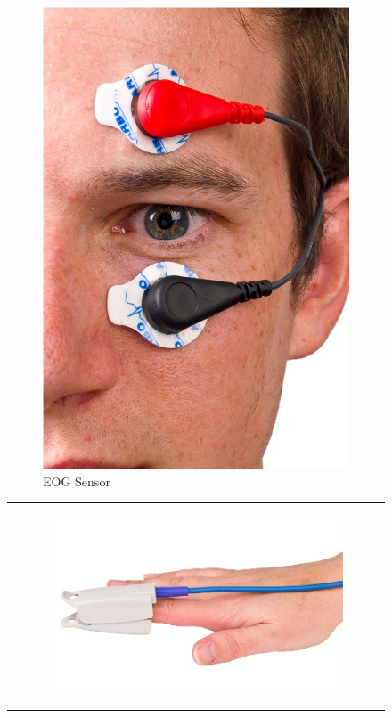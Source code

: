 \begin{figure}
	\vspace{10mm}
	\begin{subfigure}{0.41\textwidth}
		\includegraphics[width=\textwidth] {Figures/nexusEOG.jpg}
		\caption{EOG Sensor}
	\end{subfigure}
	\hfill
	\begin{tabular}{c}
		\begin{subfigure}{0.45\textwidth}
			\includegraphics[width=\textwidth] {Figures/nexusBVP.jpg}

\end{subfigure}
\end{tabular}
\end{figure}
